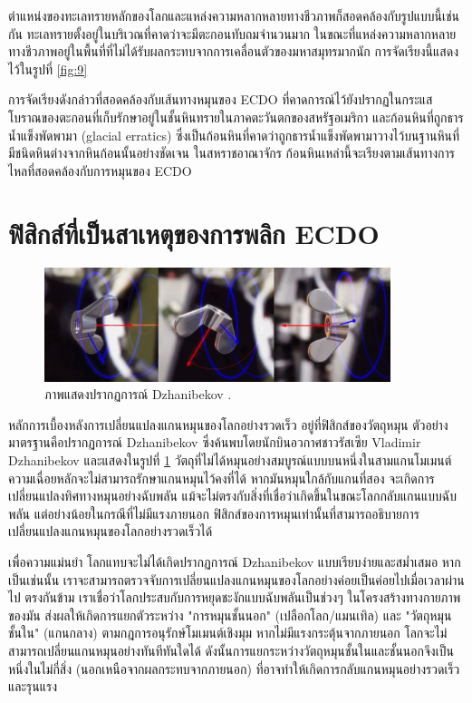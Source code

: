 \documentclass[10pt,twocolumn,letterpaper]{article}
\begin{document}
ตำแหน่งของทะเลทรายหลักของโลกและแหล่งความหลากหลายทางชีวภาพก็สอดคล้องกับรูปแบบนี้เช่นกัน ทะเลทรายตั้งอยู่ในบริเวณที่คาดว่าจะมีตะกอนทับถมจำนวนมาก ในขณะที่แหล่งความหลากหลายทางชีวภาพอยู่ในพื้นที่ที่ไม่ได้รับผลกระทบจากการเคลื่อนตัวของมหาสมุทรมากนัก \cite{28} การจัดเรียงนี้แสดงไว้ในรูปที่ \ref{fig:9}

การจัดเรียงดังกล่าวที่สอดคล้องกับเส้นทางหมุนของ ECDO ที่คาดการณ์ไว้ยังปรากฏในกระแสโบราณของตะกอนที่เก็บรักษาอยู่ในชั้นหินทรายในภาคตะวันตกของสหรัฐอเมริกา \cite{21} และก้อนหินที่ถูกธารน้ำแข็งพัดพามา (glacial erratics) ซึ่งเป็นก้อนหินที่คาดว่าถูกธารน้ำแข็งพัดพามาวางไว้บนฐานหินที่มีชนิดหินต่างจากหินก้อนนั้นอย่างชัดเจน ในสหราชอาณาจักร ก้อนหินเหล่านี้จะเรียงตามเส้นทางการไหลที่สอดคล้องกับการหมุนของ ECDO \cite{67,68}

\section{ฟิสิกส์ที่เป็นสาเหตุของการพลิก ECDO}
\begin{figure}
\begin{center}
\includegraphics[width=0.9\textwidth]{dzhani.jpg}
\end{center}
   \caption{ภาพแสดงปรากฏการณ์ Dzhanibekov \cite{28}.}
\label{fig:10}
\end{figure}

หลักการเบื้องหลังการเปลี่ยนแปลงแกนหมุนของโลกอย่างรวดเร็ว อยู่ที่ฟิสิกส์ของวัตถุหมุน ตัวอย่างมาตรฐานคือปรากฏการณ์ Dzhanibekov ซึ่งค้นพบโดยนักบินอวกาศชาวรัสเซีย Vladimir Dzhanibekov \cite{37} และแสดงในรูปที่ \ref{fig:10} วัตถุที่ไม่ได้หมุนอย่างสมบูรณ์แบบบนหนึ่งในสามแกนโมเมนต์ความเฉื่อยหลักจะไม่สามารถรักษาแกนหมุนไว้คงที่ได้ หากมันหมุนใกล้กับแกนที่สอง จะเกิดการเปลี่ยนแปลงทิศทางหมุนอย่างฉับพลัน แม้จะไม่ตรงกับสิ่งที่เชื่อว่าเกิดขึ้นในขณะโลกกลับแกนแบบฉับพลัน แต่อย่างน้อยในกรณีที่ไม่มีแรงภายนอก ฟิสิกส์ของการหมุนเท่านั้นที่สามารถอธิบายการเปลี่ยนแปลงแกนหมุนของโลกอย่างรวดเร็วได้

เพื่อความแม่นยำ โลกแทบจะไม่ได้เกิดปรากฏการณ์ Dzhanibekov แบบเรียบง่ายและสม่ำเสมอ หากเป็นเช่นนั้น เราจะสามารถตรวจจับการเปลี่ยนแปลงแกนหมุนของโลกอย่างค่อยเป็นค่อยไปเมื่อเวลาผ่านไป ตรงกันข้าม เราเชื่อว่าโลกประสบกับการหยุดชะงักแบบฉับพลันเป็นช่วงๆ ในโครงสร้างทางกายภาพของมัน ส่งผลให้เกิดการแยกตัวระหว่าง "การหมุนชั้นนอก" (เปลือกโลก/แมนเทิล) และ "วัตถุหมุนชั้นใน" (แกนกลาง) ตามกฎการอนุรักษ์โมเมนต์เชิงมุม หากไม่มีแรงกระตุ้นจากภายนอก โลกจะไม่สามารถเปลี่ยนแกนหมุนอย่างทันทีทันใดได้ ดังนั้นการแยกระหว่างวัตถุหมุนชั้นในและชั้นนอกจึงเป็นหนึ่งในไม่กี่สิ่ง (นอกเหนือจากผลกระทบจากภายนอก) ที่อาจทำให้เกิดการกลับแกนหมุนอย่างรวดเร็วและรุนแรง
\end{document}
